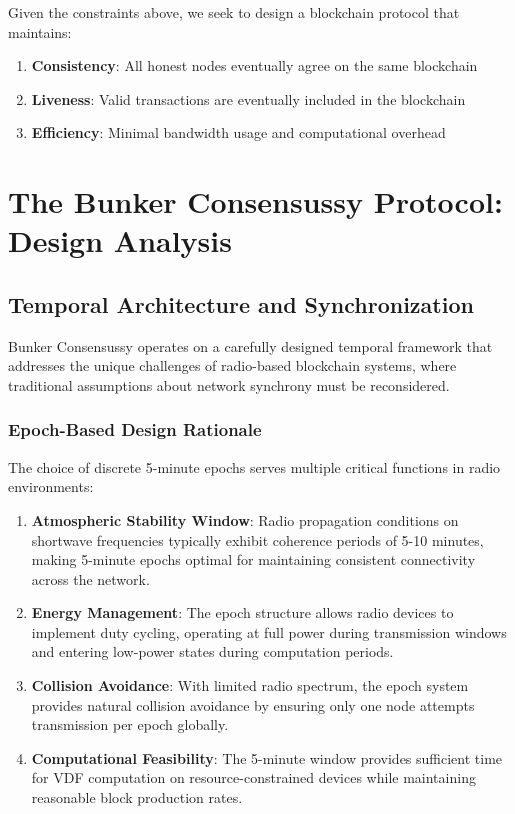 \documentclass[11pt,a4paper]{article}
\begin{document}
Given the constraints above, we seek to design a blockchain protocol that maintains:

\begin{enumerate}
\item \textbf{Consistency}: All honest nodes eventually agree on the same blockchain
\item \textbf{Liveness}: Valid transactions are eventually included in the blockchain
\item \textbf{Efficiency}: Minimal bandwidth usage and computational overhead
\end{enumerate}

\section{The Bunker Consensussy Protocol: Design Analysis}

\subsection{Temporal Architecture and Synchronization}

Bunker Consensussy operates on a carefully designed temporal framework that addresses the unique challenges of radio-based blockchain systems, where traditional assumptions about network synchrony must be reconsidered.

\subsubsection{Epoch-Based Design Rationale}

The choice of discrete 5-minute epochs serves multiple critical functions in radio environments:

\begin{enumerate}
\item \textbf{Atmospheric Stability Window}: Radio propagation conditions on shortwave frequencies typically exhibit coherence periods of 5-10 minutes, making 5-minute epochs optimal for maintaining consistent connectivity across the network.

\item \textbf{Energy Management}: The epoch structure allows radio devices to implement duty cycling, operating at full power during transmission windows and entering low-power states during computation periods.

\item \textbf{Collision Avoidance}: With limited radio spectrum, the epoch system provides natural collision avoidance by ensuring only one node attempts transmission per epoch globally.

\item \textbf{Computational Feasibility}: The 5-minute window provides sufficient time for VDF computation on resource-constrained devices while maintaining reasonable block production rates.
\end{enumerate}
\end{document}
